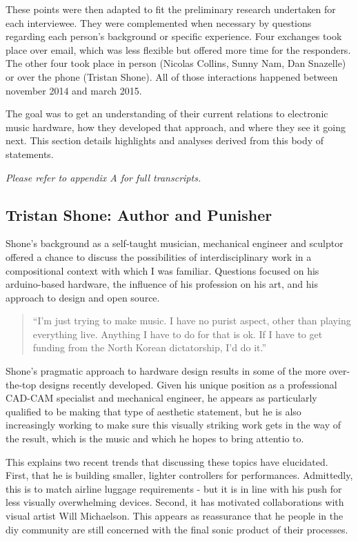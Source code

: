 These points were then adapted to fit the preliminary research undertaken for each interviewee. They were complemented when necessary by questions regarding each person's background or specific experience. Four exchanges took place over email, which was less flexible but offered more time for the responders. The other four took place in person (Nicolas Collins, Sunny Nam, Dan Snazelle) or over the phone (Tristan Shone). All of those interactions happened between november 2014 and march 2015. 

The goal was to get an understanding of their current relations to electronic music hardware, how they developed that approach, and where they see it going next. This section details highlights and analyses derived from this body of statements. 

\emph{Please refer to appendix A for full transcripts.}

\subsection{Tristan Shone: Author and Punisher}

Shone's background as a self-taught musician, mechanical engineer and sculptor offered a chance to discuss the possibilities of interdisciplinary work in a compositional context with which I was familiar. Questions focused on his arduino-based hardware, the influence of his profession on his art, and his  approach to design and open source. 

\begin{quote}
	
	``I'm just trying to make music. I have no purist aspect, other than playing everything live. Anything I have to do for that is ok. If I have to get funding from the North Korean dictatorship, I'd do it.''
	
	\end{quote}
	
Shone's pragmatic approach to hardware design results in some of the more over-the-top designs recently developed. Given his unique position as a professional CAD-CAM specialist and mechanical engineer, he appears as particularly qualified to be making that type of aesthetic statement, but he is also increasingly working to make sure this visually striking work gets in the way of the result, which is the music and which he hopes to bring attentio to. 

This explains two recent trends that discussing these topics have elucidated. First, that he is building smaller, lighter controllers for performances. Admittedly, this is to match airline luggage requirements - but it is in line with his push for less visually overwhelming devices. Second, it has motivated collaborations with visual artist Will Michaelson. This appears as reassurance that he people in the diy community are still concerned with the final sonic product of their processes. 

